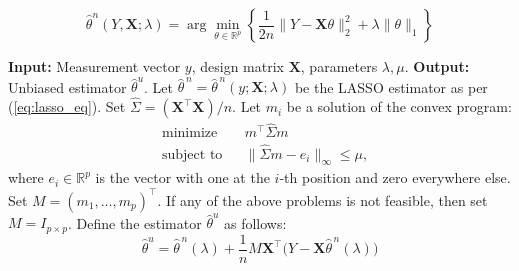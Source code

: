\documentclass[10pt,a4paper]{amsart}
\begin{document}
\begin{equation}
    \hat{\theta}^n(Y, \mathbf{X};\lambda) = \arg \underset{\theta \in \mathbb{R}^p}{\min} \left\{\frac{1}{2n}\|Y - \mathbf{X}\theta\|^2_2 + \lambda \|\theta\|_1\right\}
\label{eq:lasso_eq}
\end{equation}

\begin{algorithm}
\caption{Unbiased estimator for $\theta_0$ in high-dimensional linear regression models}
\begin{algorithmic}[1]
\Statex\textbf{Input:} Measurement vector $y$, design matrix $\mathbf{X}$, parameters $\lambda,\mu$.
\Statex\textbf{Output:} Unbiased estimator $\hat{\theta}^{u}$.
\State Let $\hat{\theta}^{\,n}=\hat{\theta}^{\,n}(y;\mathbf{X};\lambda)$ be the LASSO estimator as per (\ref{eq:lasso_eq}).
\State Set $\widehat{\Sigma}=(\mathbf{X}^{\top}\mathbf{X})/n$.
    \State Let $m_i$ be a solution of the convex program:
    \begin{equation}
    \begin{aligned}
    &\text{minimize} && m^\top \widehat{\Sigma} m \\
    &\text{subject to} && \|\widehat{\Sigma}m-e_i\|_\infty \le \mu,
    \end{aligned}
    \label{eq:convex_optimization}
    \end{equation}
    where $e_i\in\mathbb{R}^p$ is the vector with one at the $i$-th position and zero everywhere else.
\EndFor
\State Set $M=(m_1,\dots,m_p)^\top$. If any of the above problems is not feasible, then set $M=I_{p\times p}$.
\State Define the estimator $\hat{\theta}^{u}$ as follows:
\begin{equation}
    \hat{\theta}^{u}
=
\hat{\theta}^{\,n}(\lambda)
+\frac{1}{n}M\mathbf{X}^{\top}\bigl(Y-\mathbf{X}\hat{\theta}^{\,n}(\lambda)\bigr)
\label{eq:lasso_debiased}
\end{equation}
\end{algorithmic}
\end{algorithm}
\end{document}
